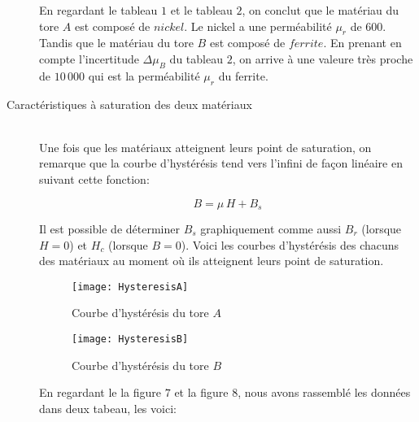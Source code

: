 \documentclass{article}
\begin{document}
\begin{description}
En regardant le tableau $1$ et le tableau $2$, on conclut que le matériau du tore $A$ est composé de $nickel$. Le nickel a une perméabilité $\mu_r$ de 600. Tandis que le matériau du tore $B$ est composé de $ferrite$. En prenant en compte l'incertitude $\Delta\mu_B$ du tableau $2$, on arrive à une valeure très proche de $10\, 000$ qui est la perméabilité $\mu_r$ du ferrite.\\

\item[Caractéristiques à saturation des deux matériaux]\hfill \\

Une fois que les matériaux atteignent leurs point de saturation, on remarque que la courbe d'hystérésis tend vers l'infini de façon linéaire en suivant cette fonction:

\begin{equation}
B = \mu\, H + B_s
\end{equation}

Il est possible de déterminer $B_s$ graphiquement comme aussi $B_r$ (lorsque $H = 0$) et $H_c$ (lorsque $B = 0$).
Voici les courbes d'hystérésis des chacuns des matériaux au moment où ils atteignent leurs point de saturation.

\pagebreak

\begin{figure}[h!]
\begin{center}
\texttt{[image: HysteresisA]}
\caption{Courbe d'hystérésis du tore $A$}
\label{fig:montage7}
\end{center}
\end{figure}


\begin{figure}[h!]
\begin{center}
\texttt{[image: HysteresisB]}
\caption{Courbe d'hystérésis du tore $B$}
\label{fig:montage8}
\end{center}
\end{figure}

En regardant le la figure $7$ et la figure $8$, nous avons rassemblé les données dans deux tabeau, les voici:\\


\end{description}
\end{document}

